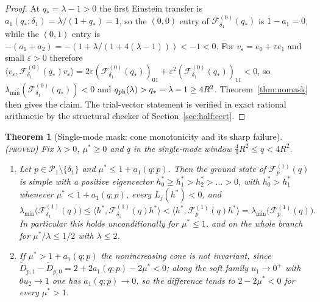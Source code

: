 \documentclass[11pt]{article}
\newcommand{\Fcal}{\mathcal F}
\newcommand{\muS}{\mu^{*}}
\newtheorem{theorem}{Theorem}[section]
\theoremstyle{definition}
\theoremstyle{remark}
\newcommand{\proved}{\textnormal{\textsc{(proved)}}}
\begin{document}
\begin{proof}
At $q_*=\lambda-1>0$ the first Einstein transfer is $a_1(q_*;\delta_1)=\lambda/(1+q_*)=1$,
so the $(0,0)$ entry of $\Fcal_{\delta_1}^{(0)}(q_*)$ is $1-a_1=0$, while the $(0,1)$
entry is $-(a_1+a_2)=-(1+\lambda/(1+4(\lambda-1)))<-1<0$. For
$v_\varepsilon=e_0+\varepsilon e_1$ and small $\varepsilon>0$ therefore
$\langle v_\varepsilon,\Fcal_{\delta_1}^{(0)}(q_*)v_\varepsilon\rangle
=2\varepsilon(\Fcal_{\delta_1}^{(0)}(q_*))_{01}
+\varepsilon^2(\Fcal_{\delta_1}^{(0)}(q_*))_{11}<0$, so
$\lambda_{\min}(\Fcal_{\delta_1}^{(0)}(q_*))<0$ and
$q_{\rm ph}(\lambda)>q_*=\lambda-1\ge4R^2$. Theorem~\ref{thm:nomask} then gives the
claim. The trial-vector statement is verified in exact rational arithmetic by the
structural checker of Section~\ref{sec:half:cert}.
\end{proof}

\begin{theorem}[Single-mode mask: cone monotonicity and its sharp failure]
\label{thm:cone}\proved
Fix $\lambda>0$, $\muS\ge0$ and $q$ in the single-mode window
$\tfrac49R^2\le q<4R^2$.
\begin{enumerate}[label=(\roman*),leftmargin=2.2em]
\item Let $p\in\mathcal P_1\setminus\{\delta_1\}$ and $\muS\le1+a_1(q;p)$. Then the
ground state of $\Fcal_p^{(1)}(q)$ is simple with a positive eigenvector
$h^*_0\ge h^*_1>h^*_2>\dots>0$, with $h^*_0>h^*_1$ whenever
$\muS<1+a_1(q;p)$, every $L_j(h^*)<0$, and
\begin{equation}\label{eq:conedom}
\lambda_{\min}\big(\Fcal_{\delta_1}^{(1)}(q)\big)
\le\langle h^*,\Fcal_{\delta_1}^{(1)}(q)h^*\rangle
<\langle h^*,\Fcal_p^{(1)}(q)h^*\rangle
=\lambda_{\min}\big(\Fcal_p^{(1)}(q)\big).
\end{equation}
In particular this holds unconditionally for $\muS\le1$, and on the whole branch for
$\muS/\lambda\le1/2$ with $\lambda\le2$.
\item If $\muS>1+a_1(q;p)$ the nonincreasing cone is not invariant, since
$\tilde D_{p,1}-\tilde D_{p,0}=2+2a_1(q;p)-2\muS<0$; along the soft family $u_1\to0^+$
with $\theta u_2\to1$ one has $a_1(q;p)\to0$, so the difference tends to $2-2\muS<0$ for
every $\muS>1$.
\end{enumerate}
\end{theorem}
\end{document}

